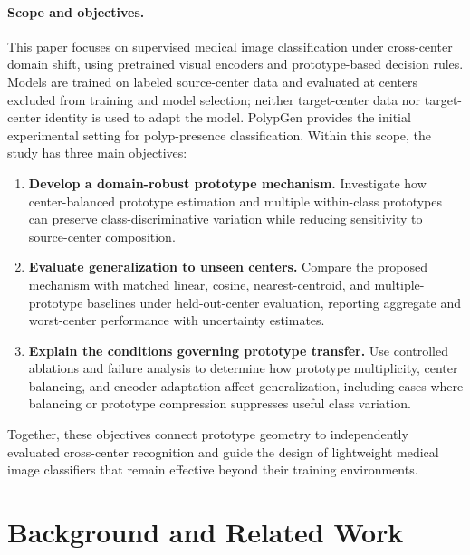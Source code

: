 \paragraph{Scope and objectives.}
This paper focuses on supervised medical image classification under cross-center domain shift, using pretrained visual encoders and prototype-based decision rules. Models are trained on labeled source-center data and evaluated at centers excluded from training and model selection; neither target-center data nor target-center identity is used to adapt the model. PolypGen provides the initial experimental setting for polyp-presence classification. Within this scope, the study has three main objectives:
\begin{enumerate}
    \item \textbf{Develop a domain-robust prototype mechanism.} Investigate how center-balanced prototype estimation and multiple within-class prototypes can preserve class-discriminative variation while reducing sensitivity to source-center composition.
    \item \textbf{Evaluate generalization to unseen centers.} Compare the proposed mechanism with matched linear, cosine, nearest-centroid, and multiple-prototype baselines under held-out-center evaluation, reporting aggregate and worst-center performance with uncertainty estimates.
    \item \textbf{Explain the conditions governing prototype transfer.} Use controlled ablations and failure analysis to determine how prototype multiplicity, center balancing, and encoder adaptation affect generalization, including cases where balancing or prototype compression suppresses useful class variation.
\end{enumerate}
Together, these objectives connect prototype geometry to independently evaluated cross-center recognition and guide the design of lightweight medical image classifiers that remain effective beyond their training environments.

\section{Background and Related Work}
\label{sec:background}

